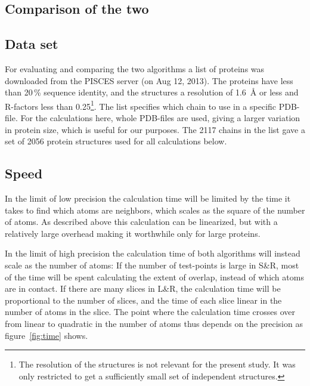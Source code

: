 \documentclass[a4paper,11pt]{article}
\begin{document}
\begin{small}
\section{Comparison of the two}\label{sec:compare}

\subsection{Data set}\label{sec:dataset}

For evaluating and comparing the two algorithms a list of proteins was
downloaded from the PISCES server \cite{PISCES} (on Aug 12, 2013). The
proteins have less than 20\,\% sequence identity, and the structures a
resolution of 1.6~Å or less and R-factors less than 0.25\footnote{The
  resolution of the structures is not relevant for the present
  study. It was only restricted to get a sufficiently small set of
  independent structures.}. The list specifies which chain to use in a
specific PDB-file. For the calculations here, whole PDB-files are
used, giving a larger variation in protein size, which is useful for
our purposes. The 2117 chains in the list gave a set of 2056 protein
structures used for all calculations below.

\subsection{Speed}\label{sec:speed}

In the limit of low precision the calculation time will be limited by
the time it takes to find which atoms are neighbors, which scales as
the square of the number of atoms. As described above this calculation
can be linearized, but with a relatively large overhead making it
worthwhile only for large proteins.

In the limit of high precision the calculation time of both algorithms
will instead scale as the number of atoms: If the number of
test-points is large in S\&R, most of the time will be spent
calculating the extent of overlap, instead of which atoms are in
contact. If there are many slices in L\&R, the calculation time will
be proportional to the number of slices, and the time of each slice
linear in the number of atoms in the slice.  The point where the
calculation time crosses over from linear to quadratic in the number
of atoms thus depends on the precision as figure~\ref{fig:time} shows.


\end{small}
\end{document}
